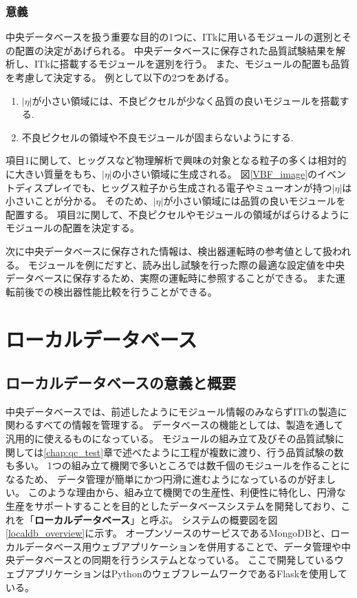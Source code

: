 \subsubsection{意義}
中央データベースを扱う重要な目的の1つに、ITkに用いるモジュールの選別とその配置の決定があげられる。
中央データベースに保存された品質試験結果を解析し、ITkに搭載するモジュールを選別を行う。
また、モジュールの配置も品質を考慮して決定する。
例として以下の2つをあげる。
\begin{enumerate}
  \item $|\eta|$が小さい領域には、不良ピクセルが少なく品質の良いモジュールを搭載する.
  \item 不良ピクセルの領域や不良モジュールが固まらないようにする.
\end{enumerate}
項目1に関して、ヒッグスなど物理解析で興味の対象となる粒子の多くは相対的に大きい質量をもち、$|\eta|$の小さい領域に生成される。
図\ref{VBF_image}のイベントディスプレイでも、ヒッグス粒子から生成される電子やミューオンが持つ$|\eta|$は小さいことが分かる。
そのため、$|\eta|$が小さい領域には品質の良いモジュールを配置する。
項目2に関して、不良ピクセルやモジュールの領域がばらけるようにモジュールの配置を決定する。


次に中央データベースに保存された情報は、検出器運転時の参考値として扱われる。
モジュールを例にだすと、読み出し試験を行った際の最適な設定値を中央データベースに保存するため、実際の運転時に参照することができる。
また運転前後での検出器性能比較を行うことができる。

\clearpage
\section{ローカルデータベース}
\subsection{ローカルデータベースの意義と概要}
中央データベースでは、前述したようにモジュール情報のみならずITkの製造に関わるすべての情報を管理する。
データベースの機能としては、製造を通して汎用的に使えるものになっている。
モジュールの組み立て及びその品質試験に関しては\ref{chap:qc_test}章で述べたように工程が複数に渡り、行う品質試験の数も多い。
1つの組み立て機関で多いところでは数千個のモジュールを作ることになるため、
データ管理が簡単にかつ円滑に進むようになっているのが好ましい。
このような理由から、組み立て機関での生産性、利便性に特化し、円滑な生産をサポートすることを目的としたデータベースシステムを開発しており、これを「\textbf{ローカルデータベース}」と呼ぶ。
システムの概要図を図\ref{localdb_overview}に示す。
オープンソースのサービスであるMongoDB\cite{4-1}と、ローカルデータベース用ウェブアプリケーションを併用することで、データ管理や中央データベースとの同期を行うシステムとなっている。
ここで開発しているウェブアプリケーションはPythonのウェブフレームワークであるFlask\cite{4-3}を使用している。

